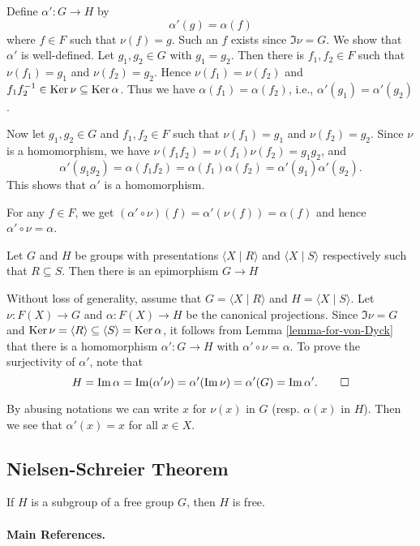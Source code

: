 \begin{sketch}
	Define $\alpha':G\to H$ by 
	\begin{equation*}
		\alpha'(g) = \alpha(f)
	\end{equation*}
	where $f \in F$ such that $\nu(f) = g$. Such an $f$ exists since $\Im \nu  = G$. We show that $\alpha'$ is well-defined.  Let $g_1, g_2\in G$ with $g_1 = g_2$. Then there is $f_1,f_2\in F$ such that $\nu(f_1) = g_1$ and $\nu(f_2) = g_2$. Hence $\nu(f_1) = \nu(f_2)$ and $f_1f_2^{-1}\in\Ker \nu\subseteq \Ker \alpha$. Thus we have $\alpha(f_1) = \alpha(f_2)$, i.e., $\alpha'(g_1) = \alpha'(g_2)$. 
	
	Now let $g_1, g_2 \in G$ and $f_1, f_2 \in F$ such that $\nu(f_1) = g_1$ and $\nu(f_2) = g_2$. Since $\nu$ is a homomorphism, we have $\nu(f_1f_2) = \nu(f_1)\nu(f_2) = g_1g_2$, and
	\begin{equation*}
		\alpha'(g_1g_2) = \alpha(f_1f_2) =  \alpha(f_1)\alpha(f_2) = 	\alpha'(g_1) \alpha'(g_2).
	\end{equation*}
	This shows that $\alpha'$ is a homomorphism.
	
	For any $f\in F$, we get $(\alpha'\circ \nu)(f) = \alpha'(\nu(f)) = \alpha(f)$ and hence $\alpha'\circ \nu = \alpha$.
\end{sketch}
\begin{theorem} \label{thm-Van-Dyck}
	Let $G$ and $H$ be groups with presentations $\langle X\mid R\rangle$ and $\langle X\mid S \rangle$ respectively such that $R\subseteq S$. Then there is an epimorphism $G\to H$ 
\end{theorem}
\begin{sketch}
	Without loss of generality, assume that $G = \langle X\mid R\rangle$ and $H =\langle X\mid S\rangle$. Let $\nu:F(X)\to G$ and $\alpha:F(X)\to  H$ be the canonical projections. Since $\Im \nu = G$ and $\Ker \nu = \langle R\rangle \subseteq \langle S\rangle = \Ker \alpha$, it follows from Lemma \ref{lemma-for-von-Dyck} that there is a homomorphism $\alpha':G\to H$ with $\alpha'\circ\nu = \alpha$. To prove the surjectivity of $\alpha'$, note that 
	\begin{equation*}
		H = \Im \alpha = \Im (\alpha'\nu) = \alpha'(\Im \nu) = \alpha'(G) = \Im \alpha'. \qedhere
	\end{equation*}
\end{sketch}
\begin{remark}
	By abusing notations we can write $x$ for $\nu(x)$ in $G$ (resp. $\alpha(x)$ in $H$). Then we see that $\alpha'(x) =x$ for all $x\in X$.  
\end{remark}
\subsection{Nielsen-Schreier Theorem}
\begin{theorem}
	If $H$ is a subgroup of a free group $G$, then $H$ is free.
\end{theorem}



\paragraph{Main References.} \cite{Lang2002,Bergman2015,Johnson1997,Ribes2010}